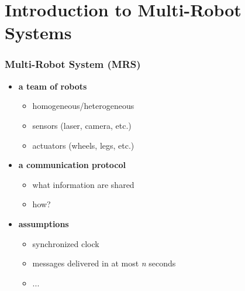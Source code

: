 \section{Introduction to Multi-Robot Systems}

\begin{frame}
	\frametitle{Multi-Robot System (MRS)}
	
	\begin{itemize}
		\item \textbf{a team of robots}
			
			\begin{itemize}
				\item homogeneous/heterogeneous
				
				\item sensors (laser, camera, etc.)
				
				\item actuators (wheels, legs, etc.)
			\end{itemize}			
		\item \textbf{a communication protocol}
			
			\begin{itemize}
				\item what information are shared
				
				\item how?
			\end{itemize}
		\item \textbf{assumptions}
			
			\begin{itemize}
				\item synchronized clock
				
				\item messages delivered in at most \emph{n} seconds
				
				\item ...
			\end{itemize}
	\end{itemize}
\end{frame}

